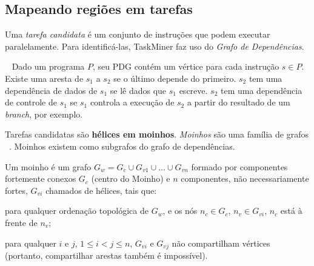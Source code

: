 \documentclass[sigplan,10pt,review]{acmart}
\newcommand\Taskminer{\mbox{\textsf{TaskMiner}}}
\begin{document}
\subsection{Mapeando regiões em tarefas}
\label{sub:identification}

Uma {\em tarefa candidata} é um conjunto de instruções que podem executar paralelamente.
Para identificá-las, {\Taskminer} faz uso do {\em Grafo de Dependências}. 

\begin{definition} ~\cite{Ferrante87}
\label{def:pdg}
Dado um programa
$P$, seu PDG contém um vértice para cada instrução $s \in P$. Existe uma aresta de 
$s_1$ a $s_2$ se o último depende do primeiro. $s_2$ tem uma dependência de dados de $s_1$
se lê dados que $s_1$ escreve. $s_2$ tem uma dependência de controle de $s_1$ se $s_1$ controla
a execução de $s_2$ a partir do resultado de um \textit{branch}, por exemplo.
\end{definition}

Tarefas candidatas são \textbf{hélices em moinhos}. {\em Moinhos} são uma família de grafos ~\cite{Rideau08}.
Moinhos existem como subgrafos do grafo de dependências. 

\begin{definition} [Moinho]
\label{def:moinho}
Um moinho é um grafo $G_w = G_c \cup G_{v1} \cup \ldots \cup G_{vn}$
formado por componentes fortemente conexos $G_c$ (centro do Moinho) e $n$ componentes, não necessariamente
fortes, $G_{vi}$ chamados de hélices, tais que:
\begin{compactenum}
\item para qualquer ordenação topológica de $G_w$, e os nós $n_c \in G_c$,
$n_v \in G_{vi}$, $n_c$ está à frente de $n_v$;
\item para qualquer $i$ e $j$, $1 \leq i < j \leq n$, $G_{vi}$ e $G_{vj}$ não
compartilham vértices (portanto, compartilhar arestas também é impossível).
\end{compactenum}
\end{definition}
\end{document}
